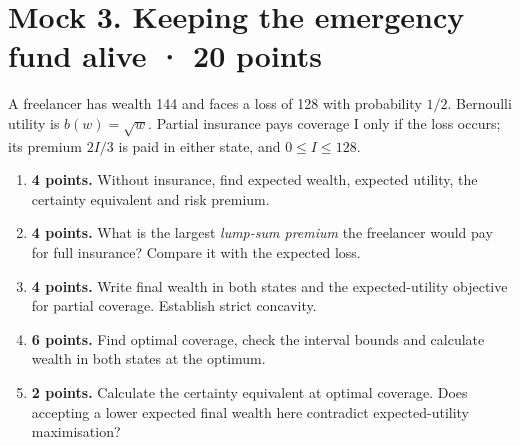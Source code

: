 \clearpage
\section*{Mock 3. Keeping the emergency fund alive · 20 points}
A freelancer has wealth 144 and faces a loss of 128 with probability $1/2$.
Bernoulli utility is $b(w)=\sqrt w$. Partial insurance pays coverage I only
if the loss occurs; its premium $2I/3$ is paid in either state, and
$0\le I\le128$.
\begin{enumerate}[label=(\alph*)]
\item \textbf{4 points.} Without insurance, find expected wealth, expected
utility, the certainty equivalent and risk premium.
\item \textbf{4 points.} What is the largest \emph{lump-sum premium} the
freelancer would pay for full insurance? Compare it with the expected loss.
\item \textbf{4 points.} Write final wealth in both states and the
expected-utility objective for partial coverage. Establish strict concavity.
\item \textbf{6 points.} Find optimal coverage, check the interval bounds
and calculate wealth in both states at the optimum.
\item \textbf{2 points.} Calculate the certainty equivalent at optimal
coverage. Does accepting a lower expected final wealth here contradict
expected-utility maximisation?
\end{enumerate}
